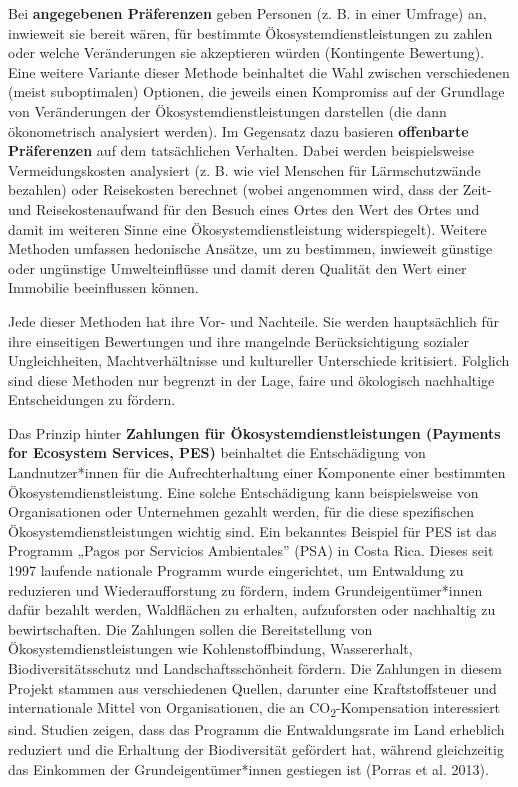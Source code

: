 \documentclass[
  nswissgerman,
  a4paper,
  DIV=11,
  numbers=noendperiod,
  oneside,
  openany]{scrreprt}
\begin{document}
Bei \textbf{angegebenen Präferenzen} geben Personen (z. B. in einer
Umfrage) an, inwieweit sie bereit wären, für bestimmte
Ökosystemdienstleistungen zu zahlen oder welche Veränderungen sie
akzeptieren würden (Kontingente Bewertung). Eine weitere Variante dieser
Methode beinhaltet die Wahl zwischen verschiedenen (meist suboptimalen)
Optionen, die jeweils einen Kompromiss auf der Grundlage von
Veränderungen der Ökosystemdienstleistungen darstellen (die dann
ökonometrisch analysiert werden). Im Gegensatz dazu basieren
\textbf{offenbarte Präferenzen} auf dem tatsächlichen Verhalten. Dabei
werden beispielsweise Vermeidungskosten analysiert (z. B. wie viel
Menschen für Lärmschutzwände bezahlen) oder Reisekosten berechnet (wobei
angenommen wird, dass der Zeit- und Reisekostenaufwand für den Besuch
eines Ortes den Wert des Ortes und damit im weiteren Sinne eine
Ökosystemdienstleistung widerspiegelt). Weitere Methoden umfassen
hedonische Ansätze, um zu bestimmen, inwieweit günstige oder ungünstige
Umwelteinflüsse und damit deren Qualität den Wert einer Immobilie
beeinflussen können.

Jede dieser Methoden hat ihre Vor- und Nachteile. Sie werden
hauptsächlich für ihre einseitigen Bewertungen und ihre mangelnde
Berücksichtigung sozialer Ungleichheiten, Machtverhältnisse und
kultureller Unterschiede kritisiert. Folglich sind diese Methoden nur
begrenzt in der Lage, faire und ökologisch nachhaltige Entscheidungen zu
fördern.

Das Prinzip hinter \textbf{Zahlungen für Ökosystemdienstleistungen
(Payments for Ecosystem Services, PES)} beinhaltet die Entschädigung von
Landnutzer*innen für die Aufrechterhaltung einer Komponente einer
bestimmten Ökosystemdienstleistung. Eine solche Entschädigung kann
beispielsweise von Organisationen oder Unternehmen gezahlt werden, für
die diese spezifischen Ökosystemdienstleistungen wichtig sind. Ein
bekanntes Beispiel für PES ist das Programm „Pagos por Servicios
Ambientales'' (PSA) in Costa Rica. Dieses seit 1997 laufende nationale
Programm wurde eingerichtet, um Entwaldung zu reduzieren und
Wiederaufforstung zu fördern, indem Grundeigentümer*innen dafür bezahlt
werden, Waldflächen zu erhalten, aufzuforsten oder nachhaltig zu
bewirtschaften. Die Zahlungen sollen die Bereitstellung von
Ökosystemdienstleistungen wie Kohlenstoffbindung, Wassererhalt,
Biodiversitätsschutz und Landschaftsschönheit fördern. Die Zahlungen in
diesem Projekt stammen aus verschiedenen Quellen, darunter eine
Kraftstoffsteuer und internationale Mittel von Organisationen, die an
CO\textsubscript{2}-Kompensation interessiert sind. Studien zeigen, dass
das Programm die Entwaldungsrate im Land erheblich reduziert und die
Erhaltung der Biodiversität gefördert hat, während gleichzeitig das
Einkommen der Grundeigentümer*innen gestiegen ist (Porras et al. 2013).
\end{document}
